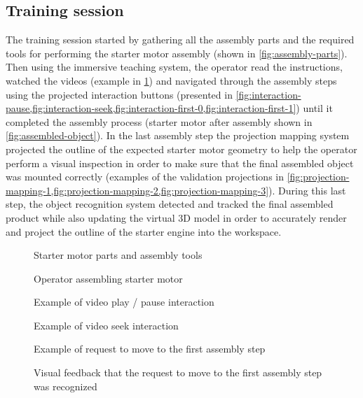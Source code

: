 \subsection{Training session}

The training session started by gathering all the assembly parts and the required tools for performing the starter motor assembly (shown in \cref{fig:assembly-parts}). Then using the immersive teaching system, the operator read the instructions, watched the videos (example in \cref{fig:assembly}) and navigated through the assembly steps using the projected interaction buttons (presented in \cref{fig:interaction-pause,fig:interaction-seek,fig:interaction-first-0,fig:interaction-first-1}) until it completed the assembly process (starter motor after assembly shown in \cref{fig:assembled-object}). In the last assembly step the projection mapping system projected the outline of the expected starter motor geometry to help the operator perform a visual inspection in order to make sure that the final assembled object was mounted correctly (examples of the validation projections in \cref{fig:projection-mapping-1,fig:projection-mapping-2,fig:projection-mapping-3}). During this last step, the object recognition system detected and tracked the final assembled product while also updating the virtual 3D model in order to accurately render and project the outline of the starter engine into the workspace.

\begin{figure}[ht]
	\begin{floatrow}[2]
		{\caption{Starter motor parts and assembly tools}\label{fig:assembly-parts}}
		{\caption{Operator assembling starter motor}\label{fig:assembly}}
	\end{floatrow}
\end{figure}

\begin{figure}[ht]
	\begin{floatrow}[4]
		{\caption{Example of video play / pause interaction}\label{fig:interaction-pause}}
		{\caption{Example of video seek interaction}\label{fig:interaction-seek}}
		{\caption{Example of request to move to the first assembly step}\label{fig:interaction-first-0}}
		{\caption{Visual feedback that the request to move to the first assembly step was recognized}\label{fig:interaction-first-1}}
	\end{floatrow}
\end{figure}

